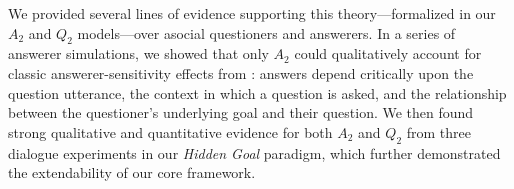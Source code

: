 \documentclass[11pt, floatsintext]{apa6}
\begin{document}
We provided several lines of evidence supporting this theory---formalized in our $A_2$ and $Q_2$ models---over asocial questioners and answerers. 
In a series of answerer simulations, we showed that only $A_2$ could qualitatively account for classic answerer-sensitivity effects from : answers depend critically upon the question utterance, the context in which a question is asked, and the relationship between the questioner's underlying goal and their question. 
We then found strong qualitative and quantitative evidence for both $A_2$ and $Q_2$ from three dialogue experiments in our \emph{Hidden Goal} paradigm, which further demonstrated the extendability of our core framework. %


\end{document}
